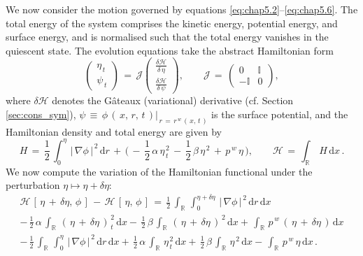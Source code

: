 \documentclass[alpha-refs, 12pt]{wiley-article}
\begin{document}
We now consider the motion governed by equations \eqref{eq:chap5.2}–\eqref{eq:chap5.6}. The total energy of the system comprises the kinetic energy, potential energy, and surface energy, and is normalised such that the total energy vanishes in the quiescent state. The evolution equations take the abstract Hamiltonian form
\begin{equation}
  \begin{pmatrix}
    \eta_{\,t} \\
    \psi_{\,t}
  \end{pmatrix}
  \,=\,\mathcal{J}
  \begin{pmatrix}
    \displaystyle\frac{\delta\mathcal{H}}{\delta\,\eta} \\[0.8em]
    \displaystyle\frac{\delta\mathcal{H}}{\delta\,\psi}
  \end{pmatrix},
  \qquad
  \mathcal{J}\,=\,\begin{pmatrix}
    0 & \mathbb{I} \\
    -\mathbb{I} & 0
  \end{pmatrix},
\end{equation}
where $\delta\mathcal{H}$ denotes the Gâteaux (variational) derivative (cf. Section \ref{sec:cons_sym}), $\psi\,\equiv\,\phi\,(\,x,\,r,\,t\,)|_{\,r\,=\,r^{\,w}\,(\,x,\,t\,)}$ is the surface potential, and the Hamiltonian density and total energy are given by
\begin{equation}
  H\,=\,\frac{1}{2}\,\int_{0}^{\eta}\,|\,\nabla\phi\,|^{\,2}\,\mathrm{d}r\,+\,\biggl(\,-\,\frac{1}{2}\,\alpha\,\eta_{\,t}^{\,2}\,-\,\frac{1}{2}\,\beta\,\eta^{\,2}\,+\,p^{\,w}\,\eta\,\biggr), \qquad
  \mathcal{H}\,=\,\int_{\mathbb{R}}\,H\,\mathrm{d}x\,.
\end{equation}
We now compute the variation of the Hamiltonian functional under the perturbation $\eta \mapsto \eta + \delta \eta$:
\begin{multline*}
  \mathcal{H}\,[\,\eta\,+\,\delta\eta,\,\phi\,]\,-\,\mathcal{H}\,[\,\eta,\,\phi\,]
  \,=\,\frac{1}{2}\,\int_{\mathbb{R}}\,\int_{0}^{\eta+\delta\eta}\,|\,\nabla\phi\,|^{\,2}\,\mathrm{d}r\,\mathrm{d}x
  \\[0.5em]
  -\,\frac{1}{2}\,\alpha\,\int_{\mathbb{R}}\,(\,\eta\,+\,\delta\eta\,)_{\,t}^{\,2}\,\mathrm{d}x
  -\,\frac{1}{2}\,\beta\,\int_{\mathbb{R}}\,(\,\eta\,+\,\delta\eta\,)^{\,2}\,\mathrm{d}x
  +\,\int_{\mathbb{R}}\,p^{\,w}\,(\,\eta\,+\,\delta\eta\,)\,\mathrm{d}x
  \\[0.5em]
  -\,\frac{1}{2}\,\int_{\mathbb{R}}\,\int_{0}^{\eta}\,|\,\nabla\phi\,|^{\,2}\,\mathrm{d}r\,\mathrm{d}x
  +\,\frac{1}{2}\,\alpha\,\int_{\mathbb{R}}\,\eta_{\,t}^{\,2}\,\mathrm{d}x
  +\,\frac{1}{2}\,\beta\,\int_{\mathbb{R}}\,\eta^{\,2}\,\mathrm{d}x
  -\,\int_{\mathbb{R}}\,p^{\,w}\,\eta\,\mathrm{d}x\,.
\end{multline*}
\end{document}
